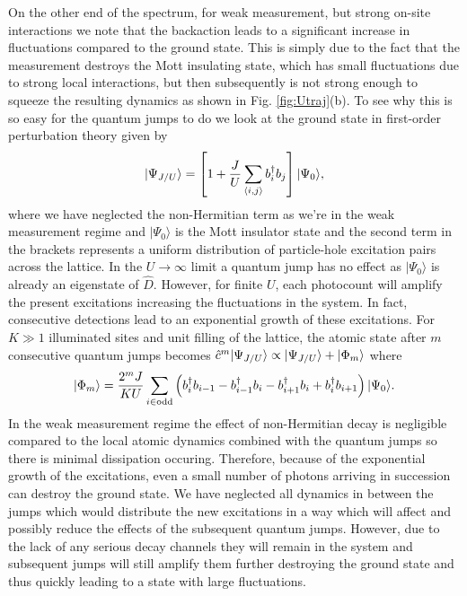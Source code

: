 On the other end of the spectrum, for weak measurement, but strong
on-site interactions we note that the backaction leads to a
significant increase in fluctuations compared to the ground
state. This is simply due to the fact that the measurement destroys
the Mott insulating state, which has small fluctuations due to strong
local interactions, but then subsequently is not strong enough to
squeeze the resulting dynamics as shown in Fig. \ref{fig:Utraj}(b). To
see why this is so easy for the quantum jumps to do we look at the
ground state in first-order perturbation theory given by
\begin{equation}
  | \Psi_{J/U} \rangle = \left[ 1 + \frac{J}{U} \sum_{\langle i, j
      \rangle} b^\dagger_i b_j \right] | \Psi_0 \rangle,
\end{equation}
where we have neglected the non-Hermitian term as we're in the weak
measurement regime and $| \Psi_0 \rangle$ is the Mott insulator state and the second
term in the brackets represents a uniform distribution of
particle-hole excitation pairs across the lattice. In the
$U \rightarrow \infty$ limit a quantum jump has no effect as
$| \Psi_0 \rangle$ is already an eigenstate of $\hat{D}$. However, for
finite $U$, each photocount will amplify the present excitations
increasing the fluctuations in the system. In fact, consecutive
detections lead to an exponential growth of these excitations. For
$K \gg 1$ illuminated sites and unit filling of the lattice, the
atomic state after $m$ consecutive quantum jumps becomes
$\hat{c}^m | \Psi_{J/U} \rangle \propto | \Psi_{J/U} \rangle + | \Phi_m
\rangle$ where
\begin{equation}
  | \Phi_m \rangle = \frac{2^m J} {K U} \sum_{i \in
    \mathrm{odd}} \left( b^\dagger_i b_{i-1} - b^\dagger_{i-1} b_i - b^\dagger_{i+1} b_i
    + b^\dagger_i b_{i+1} \right) | \Psi_0 \rangle.
\end{equation}
In the weak measurement regime the effect of non-Hermitian decay is
negligible compared to the local atomic dynamics combined with the
quantum jumps so there is minimal dissipation occuring. Therefore,
because of the exponential growth of the excitations, even a small
number of photons arriving in succession can destroy the ground
state. We have neglected all dynamics in between the jumps which would
distribute the new excitations in a way which will affect and possibly
reduce the effects of the subsequent quantum jumps. However, due to
the lack of any serious decay channels they will remain in the system
and subsequent jumps will still amplify them further destroying the
ground state and thus quickly leading to a state with large
fluctuations.

